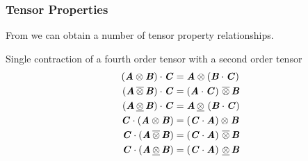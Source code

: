 \subsubsection{Tensor Properties}
\label{subsubsec:TensorPropertiesFourthOrder}

From \cite{kintzel_fourth-order_2006} we can obtain a number of tensor
property relationships.

Single contraction of a fourth order tensor with a second order tensor
\begin{align}
   \left(  \boldsymbol{\mathit{A}} \otimes \boldsymbol{\mathit{B}}  \right)  \cdot  \boldsymbol{\mathit{C}} &= \boldsymbol{\mathit{A}} \otimes \left(  \boldsymbol{\mathit{B}}  \cdot  \boldsymbol{\mathit{C}}  \right) \\
   \left(  \boldsymbol{\mathit{A}} \, \overline{\otimes} \, \boldsymbol{\mathit{B}}  \right)  \cdot  \boldsymbol{\mathit{C}} &= \left(  \boldsymbol{\mathit{A}}  \cdot  \boldsymbol{\mathit{C}}  \right) \, \overline{\otimes} \, \boldsymbol{\mathit{B}} \\
   \left(  \boldsymbol{\mathit{A}} \, \underline{\otimes} \, \boldsymbol{\mathit{B}}  \right)  \cdot  \boldsymbol{\mathit{C}} &= \boldsymbol{\mathit{A}} \, \underline{\otimes} \, \left(  \boldsymbol{\mathit{B}}  \cdot  \boldsymbol{\mathit{C}}  \right) \\
   \boldsymbol{\mathit{C}}  \cdot  \left(  \boldsymbol{\mathit{A}} \otimes \boldsymbol{\mathit{B}}  \right) &= \left(  \boldsymbol{\mathit{C}}  \cdot  \boldsymbol{\mathit{A}}  \right) \otimes \boldsymbol{\mathit{B}} \\
   \boldsymbol{\mathit{C}}  \cdot  \left(  \boldsymbol{\mathit{A}} \, \overline{\otimes} \, \boldsymbol{\mathit{B}}  \right) &= \left(  \boldsymbol{\mathit{C}}  \cdot  \boldsymbol{\mathit{A}}  \right) \, \overline{\otimes} \, \boldsymbol{\mathit{B}} \\
   \boldsymbol{\mathit{C}}  \cdot  \left(  \boldsymbol{\mathit{A}} \, \underline{\otimes} \, \boldsymbol{\mathit{B}}  \right) &= \left(  \boldsymbol{\mathit{C}}  \cdot  \boldsymbol{\mathit{A}}  \right) \, \underline{\otimes} \, \boldsymbol{\mathit{B}} 
\end{align}

